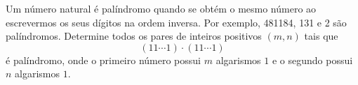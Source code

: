 Um número natural é palíndromo quando se obtém o mesmo número ao escrevermos os seus dígitos na ordem inversa.
Por exemplo, 481184, 131 e 2 são palíndromos.
Determine todos os pares de inteiros positivos $(m, n)$ tais que
$$ (11\cdots1) \cdot (11\cdots1)$$
é palíndromo, onde o primeiro número possui $m$ algarismos $1$ e o segundo possui $n$ algarismos $1$.